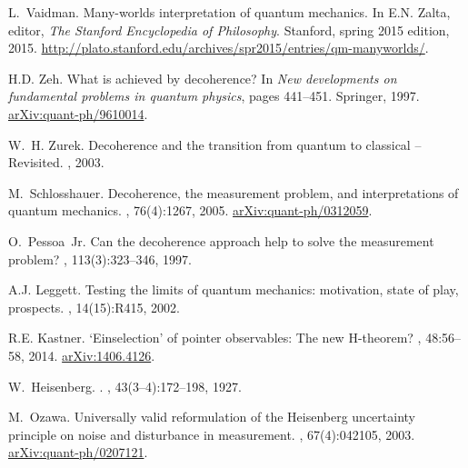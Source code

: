 \documentclass[11pt]{amsart}
\theoremstyle{definition}
\theoremstyle{plain}
\begin{document}
\begin{thebibliography}{10}
L.~Vaidman.
\newblock Many-worlds interpretation of quantum mechanics.
\newblock In E.N. Zalta, editor, {\em The Stanford Encyclopedia of Philosophy}.
  Stanford, spring 2015 edition, 2015.
\newblock
  \href{http://plato.stanford.edu/archives/spr2015/entries/qm-manyworlds/}{http://plato.stanford.edu/archives/spr2015/entries/qm-manyworlds/}.

H.D. Zeh.
\newblock What is achieved by decoherence?
\newblock In {\em New developments on fundamental problems in quantum physics},
  pages 441--451. Springer, 1997.
\newblock \href{http://arxiv.org/abs/quant-ph/9610014}{arXiv:quant-ph/9610014}.

W.~H. Zurek.
\newblock Decoherence and the transition from quantum to classical --
  {R}evisited.
, 2003.

M.~Schlosshauer.
\newblock Decoherence, the measurement problem, and interpretations of quantum
  mechanics.
, 76(4):1267, 2005.
\newblock \href{http://arxiv.org/abs/quant-ph/0312059}{arXiv:quant-ph/0312059}.

O.~Pessoa~Jr.
\newblock Can the decoherence approach help to solve the measurement problem?
, 113(3):323--346, 1997.

A.J. Leggett.
\newblock Testing the limits of quantum mechanics: motivation, state of play,
  prospects.
, 14(15):R415, 2002.

R.E. Kastner.
\newblock `{E}inselection' of pointer observables: {T}he new {H}-theorem?
,
  48:56--58, 2014.
\newblock \href{http://arxiv.org/abs/1406.4126}{arXiv:1406.4126}.

W.~Heisenberg.
.
, 43(3--4):172--198, 1927.

M.~Ozawa.
\newblock Universally valid reformulation of the {H}eisenberg uncertainty
  principle on noise and disturbance in measurement.
, 67(4):042105, 2003.
\newblock \href{http://arxiv.org/abs/quant-ph/0207121}{arXiv:quant-ph/0207121}.


\end{thebibliography}
\end{document}
